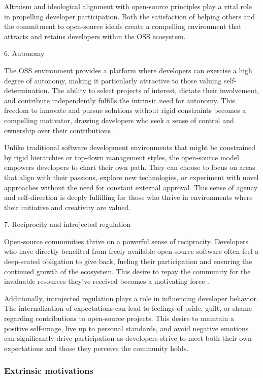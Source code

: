 Altruism and ideological alignment with open-source principles play a vital role in propelling developer participation. Both the satisfaction of helping others and the commitment to open-source ideals create a compelling environment that attracts and retains developers within the OSS ecosystem.

6. Autonomy

The OSS environment provides a platform where developers can exercise a high degree of autonomy, making it particularly attractive to those valuing self-determination. The ability to select projects of interest, dictate their involvement, and contribute independently fulfills the intrinsic need for autonomy. This freedom to innovate and pursue solutions without rigid constraints becomes a compelling motivator, drawing developers who seek a sense of control and ownership over their contributions \cite{16ke2008motivations}.

Unlike traditional software development environments that might be constrained by rigid hierarchies or top-down management styles, the open-source model empowers developers to chart their own path. They can choose to focus on areas that align with their passions, explore new technologies, or experiment with novel approaches without the need for constant external approval.  This sense of agency and self-direction is deeply fulfilling for those who thrive in environments where their initiative and creativity are valued.

7. Reciprocity and introjected regulation

Open-source communities thrive on a powerful sense of reciprocity. Developers who have directly benefited from freely available open-source software often feel a deep-seated obligation to give back, fueling their participation and ensuring the continued growth of the ecosystem. This desire to repay the community for the invaluable resources they've received becomes a motivating force \cite{11gerosa2021shifting,13li2012leadership}.

Additionally, introjected regulation plays a role in influencing developer behavior. The internalization of expectations can lead to feelings of pride, guilt, or shame regarding contributions to open-source projects. This desire to maintain a positive self-image, live up to personal standards, and avoid negative emotions can significantly drive participation as developers strive to meet both their own expectations and those they perceive the community holds.

\subsubsection{Extrinsic motivations}


